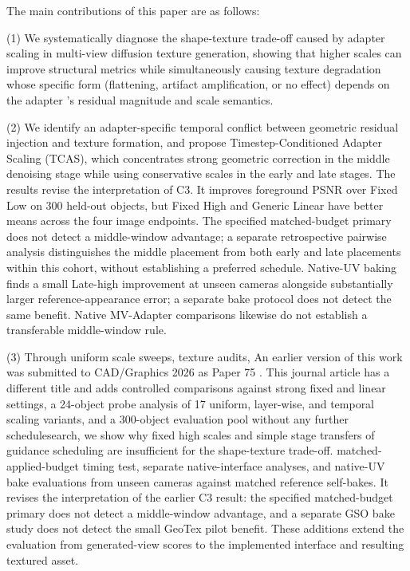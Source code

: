 \documentclass[times,twocolumn,final]{elsarticle}
\providecommand{\DIFadd}[1]{{\protect\color{blue} \sf #1}} %
\providecommand{\DIFdel}[1]{{\protect\color{red} \scriptsize #1}} %
\providecommand{\DIFaddbegin}{} %
\providecommand{\DIFaddend}{} %
\providecommand{\DIFdelbegin}{} %
\providecommand{\DIFdelend}{} %
\begin{document}
\DIFdelbegin \DIFdel{The main contributions of this paper are as follows:
}%

\DIFdel{(1) We systematically diagnose the shape-texture trade-off caused by adapter scaling in multi-view diffusion texture generation, showing that higher scales can improve structural metrics while simultaneously causing texture degradation whose specific form (flattening, artifact amplification, or no effect) depends on the adapter 's residual magnitude and scale semantics.
}%

\DIFdel{(2) We identify an adapter-specific temporal conflict between geometric residual injection and texture formation, and propose Timestep-Conditioned Adapter Scaling (TCAS), which concentrates strong geometric correction in the middle denoising stage while using conservative scales in the early and late stages.
}\DIFdelend \DIFaddbegin \DIFadd{The results revise the interpretation of C3. It improves foreground PSNR over Fixed Low on 300 held-out objects, but Fixed High and Generic Linear have better means across the four image endpoints. The specified matched-budget primary does not detect a middle-window advantage; a separate retrospective pairwise analysis distinguishes the middle placement from both early and late placements within this cohort, without establishing a preferred schedule. Native-UV baking finds a small Late-high improvement at unseen cameras alongside substantially larger reference-appearance error; a separate bake protocol does not detect the same benefit. Native MV-Adapter comparisons likewise do not establish a transferable middle-window rule.
}\DIFaddend

\DIFdelbegin \DIFdel{(3) Through uniform scale sweeps, texture audits, }\DIFdelend \DIFaddbegin \DIFadd{An earlier version of this work was submitted to CAD/Graphics 2026 as Paper 75 \cite{che2026cadgraphics}. This journal article has a different title and adds controlled comparisons against strong fixed and linear settings, }\DIFaddend a \DIFdelbegin \DIFdel{24-object probe analysis of 17 uniform, layer-wise, and temporal scaling variants, and a 300-object evaluation pool without any further schedulesearch, we show why fixed high scales and simple stage transfers of guidance scheduling are insufficient for the shape-texture trade-off. }\DIFdelend \DIFaddbegin \DIFadd{matched-applied-budget timing test, separate native-interface analyses, and native-UV bake evaluations from unseen cameras against matched reference self-bakes. It revises the interpretation of the earlier C3 result: the specified matched-budget primary does not detect a middle-window advantage, and a separate GSO bake study does not detect the small GeoTex pilot benefit. These additions extend the evaluation from generated-view scores to the implemented interface and resulting textured asset.
}\DIFaddend
\end{document}
